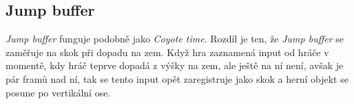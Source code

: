 \subsection{Jump buffer}

\textit{Jump buffer} funguje podobně jako \textit{Coyote time}. Rozdíl je ten, že \textit{Jump buffer} se zaměřuje na skok při dopadu na zem. Když hra zaznamená input od hráče v momentě, kdy hráč teprve dopadá z výšky na zem, ale ještě na ní není, avšak je pár framů nad ní, tak se tento input opět zaregistruje jako skok a herní objekt se posune po vertikální ose.